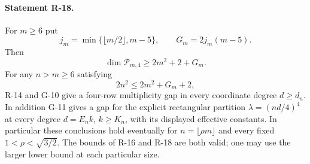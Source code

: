 \paragraph{Statement R-18.}
For $m\geq6$ put
\[
 j_m=\min\{\lfloor m/2\rfloor,m-5\},\qquad
 G_m=2j_m(m-5).
\]
Then
\begin{equation}\label{R18:dimension}
 \dim\mathcal P_{m,4}\geq2m^2+2+G_m.
\end{equation}
For any $n>m\geq6$ satisfying
\begin{equation}\label{R18:padding}
 2n^2\leq2m^2+G_m+2,
\end{equation}
R-14 and G-10 give a four-row multiplicity gap in every
coordinate degree $d\geq d_n$. In addition G-11 gives a
gap for the explicit rectangular partition
$\lambda=(nd/4)^4$ at every degree
$d=E_n k$, $k\geq K_n$, with its displayed effective
constants. In particular these conclusions hold eventually
for $n=\lfloor\rho m\rfloor$ and every fixed
$1<\rho<\sqrt{3/2}$.
The bounds of R-16 and R-18 are both valid; one may use the
larger lower bound at each particular size.

